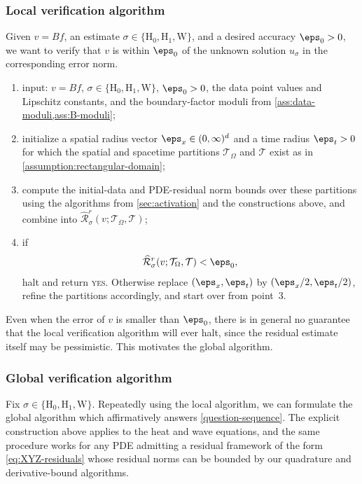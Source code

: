\subsubsection{Local verification algorithm}

Given $v=Bf$, an estimate
$\sigma\in\{\mathrm H_0,\mathrm H_1,\mathrm W\}$, and a desired accuracy
$\eps_0>0$, we want to verify that $v$ is within $\eps_0$ of the unknown
solution $u_\sigma$ in the corresponding error norm.

\begin{enumerate}
    \item input: $v=Bf$, $\sigma\in\{\mathrm H_0,\mathrm H_1,\mathrm W\}$,
    $\eps_0>0$, the data point values and Lipschitz constants, and the
    boundary-factor moduli from
    \cref{ass:data-moduli,ass:B-moduli};
    \item initialize a spatial radius vector $\boldsymbol{\eps}_x\in(0,\infty)^d$
    and a time radius $\eps_t>0$ for which the spatial and spacetime
    partitions $\mathcal T_\Omega$ and $\mathcal T$ exist as in
    \cref{assumption:rectangular-domain};
    \item compute the initial-data and PDE-residual norm bounds over
    these partitions using the algorithms from \cref{sec:activation} and the
    constructions above, and combine into
    $\widehat{\mathcal R}_{\sigma}^r
    (v;\mathcal T_\Omega,\mathcal T)$;
    \item if
    \begin{equation}\label{eq:ima-halting-criterion}
        \widehat{\mathcal R}_{\sigma}^r
        (v;\mathcal T_\Omega,\mathcal T)<\eps_0,
    \end{equation}
    halt and return \textsc{yes}. Otherwise replace
    $(\boldsymbol{\eps}_x,\eps_t)$ by
    $(\boldsymbol{\eps}_x/2,\eps_t/2)$, refine the partitions accordingly,
    and start over from point~3.
\end{enumerate}

Even when the error of $v$ is smaller than $\eps_0$, there is in general no
guarantee that the local verification algorithm will ever halt, since the
residual estimate itself may be pessimistic. This motivates the global
algorithm.

\subsubsection{Global verification algorithm}

Fix $\sigma\in\{\mathrm H_0,\mathrm H_1,\mathrm W\}$.  Repeatedly using the local algorithm, we can formulate the
global algorithm which affirmatively answers \cref{question-sequence}. The explicit
construction above applies to the heat and wave equations, and the same
procedure works for any PDE admitting a residual framework of the form
\eqref{eq:XYZ-residuals} whose residual norms can be bounded by our
quadrature and derivative-bound algorithms.

